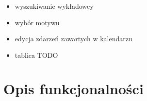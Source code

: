 \documentclass[a4paper,11pt]{uzreport}
\begin{document}
\begin{itemize}[leftmargin=0.50in]
\begin{itemize}[leftmargin=0.25in]
                \item wyszukiwanie wykładowcy
                
                \item wybór motywu
                
                \item edycja zdarzeń zawartych w kalendarzu
                
                \item tablica TODO
     
            \end{itemize}
     
    \end{itemize}
    
\clearpage
\section{Opis funkcjonalności}
    
\end{document}
